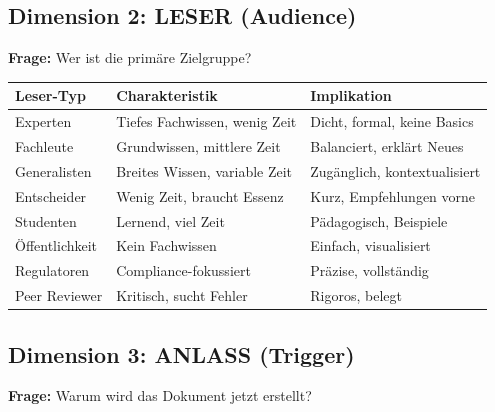 \documentclass[12pt,a4paper]{article}
\begin{document}
\subsection{Dimension 2: LESER (Audience)}

\textbf{Frage:} Wer ist die primäre Zielgruppe?

\begin{table}[htbp]
\centering
\renewcommand{\arraystretch}{1.3}
\begin{tabular}{@{}lp{5cm}p{5cm}@{}}
\toprule
\textbf{Leser-Typ} & \textbf{Charakteristik} & \textbf{Implikation} \\
\midrule
Experten & Tiefes Fachwissen, wenig Zeit & Dicht, formal, keine Basics \\
Fachleute & Grundwissen, mittlere Zeit & Balanciert, erklärt Neues \\
Generalisten & Breites Wissen, variable Zeit & Zugänglich, kontextualisiert \\
Entscheider & Wenig Zeit, braucht Essenz & Kurz, Empfehlungen vorne \\
Studenten & Lernend, viel Zeit & Pädagogisch, Beispiele \\
Öffentlichkeit & Kein Fachwissen & Einfach, visualisiert \\
Regulatoren & Compliance-fokussiert & Präzise, vollständig \\
Peer Reviewer & Kritisch, sucht Fehler & Rigoros, belegt \\
\bottomrule
\end{tabular}
\end{table}

\subsection{Dimension 3: ANLASS (Trigger)}

\textbf{Frage:} Warum wird das Dokument jetzt erstellt?
\end{document}
